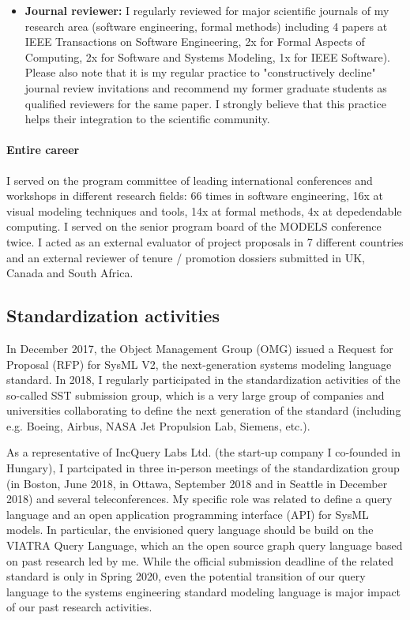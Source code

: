 \begin{itemize}[leftmargin=0.5cm]
\item \textbf{Journal reviewer:}
I regularly reviewed for major scientific journals of my research area (software engineering, formal methods) including 4 papers at IEEE Transactions on Software Engineering, 2x for Formal Aspects of Computing, 2x for Software and Systems Modeling, 1x for IEEE Software). Please also note that it is my regular practice to "constructively decline" journal review invitations and recommend my former graduate students as qualified reviewers for the same paper. I strongly believe that this practice helps their integration to the scientific community. 
\end{itemize}

\paragraph{Entire career}
I served on the program committee of leading international conferences and workshops in different research fields: 66 times in software engineering, 16x at visual modeling techniques and tools, 14x at formal methods, 4x at depedendable computing. I served on the senior program board of the MODELS conference twice. I acted as an external evaluator of project proposals in 7 different countries and an external reviewer of tenure / promotion dossiers submitted in UK, Canada and South Africa. 

\subsection{Standardization activities}
In December 2017, the Object Management Group (OMG) issued a Request for Proposal (RFP) for SysML V2, the next-generation systems modeling language standard. In 2018, I regularly participated in the standardization activities of the so-called SST submission group, which is a very large group of companies and universities collaborating to define the next generation of the standard (including e.g. Boeing, Airbus, NASA Jet Propulsion Lab, Siemens, etc.).

As a representative of IncQuery Labs Ltd. (the start-up company I co-founded in Hungary), I partcipated in three in-person meetings of the standardization group (in Boston, June 2018, in Ottawa, September 2018 and in Seattle in December 2018) and several teleconferences. My specific role was related to define a query language and an open application programming interface (API) for SysML models. In particular, the envisioned query language should be build on the VIATRA Query Language, which an the open source graph query language based on past research led by me. While the official submission deadline of the related standard is only in Spring 2020, even the potential transition of our query language to the systems engineering standard modeling language is major impact of our past research activities. 

